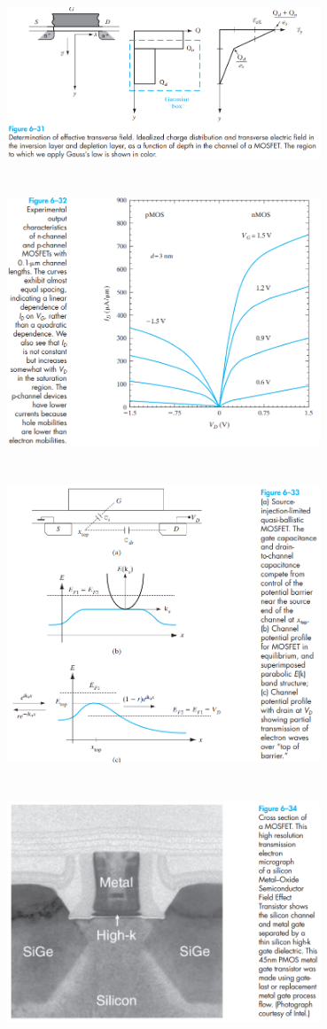 \documentclass[8pt]{article}
\newcommand{\hl}{\noindent\makebox[\linewidth]{\rule{\textwidth}{0.2pt}}}
\begin{document}
\begin{center}
		\includegraphics[width=0.7\textwidth]{fig6-31} \\ \hl \\~\\
		\includegraphics[width=0.7\textwidth]{fig6-32} \\ \hl \\~\\
		\includegraphics[width=0.7\textwidth]{fig6-33} \\ \hl \\~\\
		\includegraphics[width=0.7\textwidth]{fig6-34} \\ \hl \\~\\

\end{center}
\end{document}

